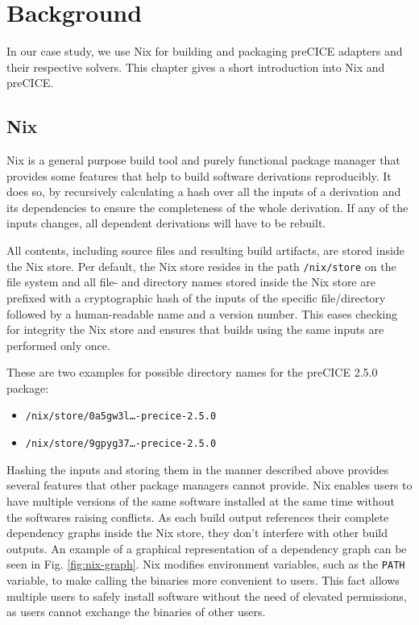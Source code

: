 \documentclass{eceasst}
\begin{document}
\section{Background}

In our case study, we use Nix for building and packaging preCICE adapters and their respective solvers.
This chapter gives a short introduction into Nix and preCICE.

\subsection{Nix}

Nix is a general purpose build tool and purely functional package manager that provides some features that help to build software derivations reproducibly.
It does so, by recursively calculating a hash over all the inputs of a derivation and its dependencies to ensure the completeness of the whole derivation.
If any of the inputs changes, all dependent derivations will have to be rebuilt.

All contents, including source files and resulting build artifacts, are stored inside the Nix store.
Per default, the Nix store resides in the path \texttt{/nix/store} on the file system and all file- and directory names stored inside the Nix store are prefixed with a cryptographic hash of the inputs of the specific file/directory followed by a human-readable name and a version number.
This eases checking for integrity the Nix store and ensures that builds using the same inputs are performed only once.

These are two examples for possible directory names for the preCICE 2.5.0 package:

\begin{itemize}
  \item \texttt{/nix/store/0a5gw3l\ldots-precice-2.5.0}
  \item \texttt{/nix/store/9gpyg37\ldots-precice-2.5.0}
\end{itemize}

Hashing the inputs and storing them in the manner described above provides several features that other package managers cannot provide.
Nix enables users to have multiple versions of the same software installed at the same time without the softwares raising conflicts.
As each build output references their complete dependency graphs inside the Nix store, they don't interfere with other build outputs.
An example of a graphical representation of a dependency graph can be seen in Fig. \ref{fig:nix-graph}.
Nix modifies environment variables, such as the \texttt{PATH} variable, to make calling the binaries more convenient to users.
This fact allows multiple users to safely install software without the need of elevated permissions, as users cannot exchange the binaries of other users.
\end{document}
